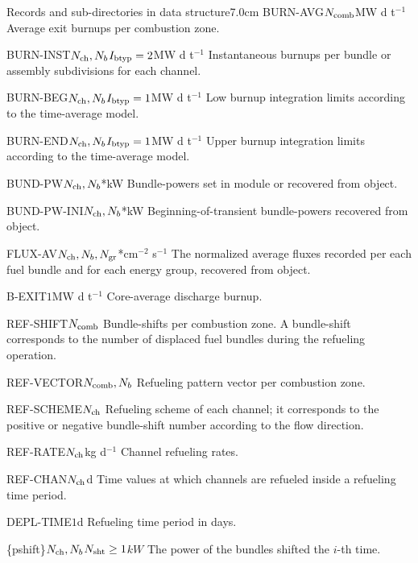 \begin{DescriptionEnregistrement}{Records and sub-directories
 in  data structure}{7.0cm}
\RealEnr
 {BURN-AVG}{$N_{\rm comb}$}{MW d t$^{-1}$}
 {Average exit burnups per combustion zone.}

\OptRealEnr
 {BURN-INST}{$N_{\rm ch}, N_b$}{$I_{\rm btyp}=2$}{MW d t$^{-1}$}
 {Instantaneous burnups per bundle or assembly subdivisions for each channel.}

\OptRealEnr
 {BURN-BEG}{$N_{\rm ch}, N_b$}{$I_{\rm btyp}=1$}{MW d t$^{-1}$}
 {Low burnup integration limits according to the time-average model.}

\OptRealEnr
 {BURN-END}{$N_{\rm ch}, N_b$}{$I_{\rm btyp}=1$}{MW d t$^{-1}$}
 {Upper burnup integration limits according to the time-average model.}

\OptRealEnr
 {BUND-PW}{$N_{\rm ch}, N_b$}{*}{kW}
 {Bundle-powers set in  module or recovered from  object.}

\OptRealEnr
 {BUND-PW-INI}{$N_{\rm ch}, N_b$}{*}{kW}
 {Beginning-of-transient bundle-powers recovered from  object.}

\OptRealEnr
 {FLUX-AV}{$N_{\rm ch}, N_b, N_{\rm gr}$}{*}{cm$^{-2}$ s$^{-1}$}
 {The normalized average fluxes recorded per each fuel bundle and for
  each energy group, recovered from  object.}

\RealEnr
 {B-EXIT}{$1$}{MW d t$^{-1}$}
 {Core-average discharge burnup.}

\IntEnr
 {REF-SHIFT}{$N_{\rm comb}$}
 {Bundle-shifts per combustion zone. A bundle-shift corresponds to the 
  number of displaced fuel bundles during the refueling operation.}

\IntEnr
 {REF-VECTOR}{$N_{\rm comb}, N_b$}
 {Refueling pattern vector per combustion zone.}

\IntEnr
 {REF-SCHEME}{$N_{\rm ch}$}
 {Refueling scheme of each channel; it corresponds to the positive
  or negative bundle-shift number according to the flow direction. }

\RealEnr
 {REF-RATE}{$N_{\rm ch}$}{kg d$^{-1}$}
 {Channel refueling rates.}

\OptRealEnr
 {REF-CHAN}{$N_{\rm ch}$}{}{d}
 {Time values at which channels are refueled inside a refueling time 
 period.}

\OptRealEnr
 {DEPL-TIME}{$1$}{}{d}
 {Refueling time period in days.}

\OptRealVar
 {\{pshift\}}{$N_{\rm ch}, N_b$}{$N_{\rm sht}\ge 1$}{$kW$}
 {The power of the bundles shifted the $i$-th time.}
            

\end{DescriptionEnregistrement}
